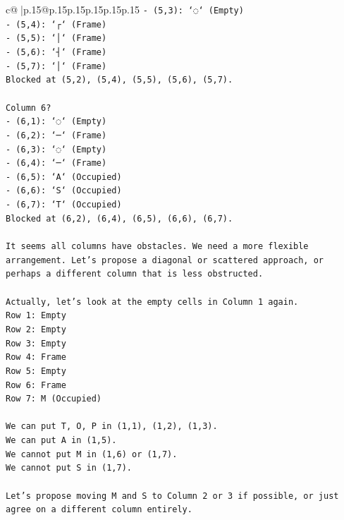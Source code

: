 \documentclass{article}
\begin{document}
{\begin{supertabular}{c@{$\;$}|p{.15\linewidth}@{}p{.15\linewidth}p{.15\linewidth}p{.15\linewidth}p{.15\linewidth}p{.15\linewidth}}
{{{\texttt{{-} (5,3): `◌` (Empty)} \\
\texttt{{-} (5,4): `┌` (Frame)} \\
\texttt{{-} (5,5): `│` (Frame)} \\
\texttt{{-} (5,6): `┤` (Frame)} \\
\texttt{{-} (5,7): `│` (Frame)} \\
\texttt{Blocked at (5,2), (5,4), (5,5), (5,6), (5,7).} \\
\\ 
\texttt{Column 6?} \\
\texttt{{-} (6,1): `◌` (Empty)} \\
\texttt{{-} (6,2): `─` (Frame)} \\
\texttt{{-} (6,3): `◌` (Empty)} \\
\texttt{{-} (6,4): `─` (Frame)} \\
\texttt{{-} (6,5): `A` (Occupied)} \\
\texttt{{-} (6,6): `S` (Occupied)} \\
\texttt{{-} (6,7): `T` (Occupied)} \\
\texttt{Blocked at (6,2), (6,4), (6,5), (6,6), (6,7).} \\
\\ 
\texttt{It seems all columns have obstacles. We need a more flexible arrangement. Let's propose a diagonal or scattered approach, or perhaps a different column that is less obstructed.} \\
\\ 
\texttt{Actually, let's look at the empty cells in Column 1 again.} \\
\texttt{Row 1: Empty} \\
\texttt{Row 2: Empty} \\
\texttt{Row 3: Empty} \\
\texttt{Row 4: Frame} \\
\texttt{Row 5: Empty} \\
\texttt{Row 6: Frame} \\
\texttt{Row 7: M (Occupied)} \\
\\ 
\texttt{We can put T, O, P in (1,1), (1,2), (1,3).} \\
\texttt{We can put A in (1,5).} \\
\texttt{We cannot put M in (1,6) or (1,7).} \\
\texttt{We cannot put S in (1,7).} \\
\\ 
\texttt{Let's propose moving M and S to Column 2 or 3 if possible, or just agree on a different column entirely.} \\
}}}
\end{supertabular}}
\end{document}
